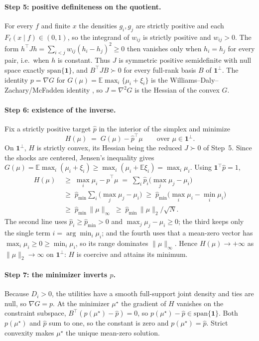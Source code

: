 \documentclass[12pt]{article}
\theoremstyle{remark}
\newcommand{\E}{\mathbb{E}}
\begin{document}
\paragraph{Step 5: positive definiteness on the quotient.} For every $f$
and finite $x$ the densities $g_i, g_j$ are strictly positive and each
$F_\ell(x\mid f)\in(0,1)$, so the integrand of $w_{ij}$ is strictly
positive and $w_{ij}>0$. The form
$h^\top J h = \sum_{i<j} w_{ij}(h_i-h_j)^2 \ge 0$ then vanishes only when
$h_i=h_j$ for every pair, i.e.\ when $h$ is constant. Thus $J$ is
symmetric positive semidefinite with null space exactly
$\mathrm{span}\{\mathbf{1}\}$, and $B^\top J B \succ 0$ for every
full-rank basis $B$ of $\mathbf{1}^\perp$. The identity $p=\nabla G$ for
$G(\mu)=\E\max_i\{\mu_i+\xi_i\}$ is the Williams--Daly--Zachary/McFadden
identity \citep{williams1977,daly1978,mcfadden1981}, so $J=\nabla^2 G$ is
the Hessian of the convex $G$.

\paragraph{Step 6: existence of the inverse.} Fix a strictly positive
target $\hat p$ in the interior of the simplex and minimize
\[
H(\mu) \;=\; G(\mu) - \hat p^\top \mu
\qquad \text{over } \mu\in\mathbf{1}^\perp .
\]
On $\mathbf{1}^\perp$, $H$ is strictly convex, its Hessian being the
reduced $J\succ0$ of Step~5. Since the shocks are centered, Jensen's
inequality gives
$G(\mu)=\E\max_i(\mu_i+\xi_i) \ge \max_i(\mu_i+\E\xi_i) = \max_i\mu_i$.
Using $\mathbf{1}^\top\hat p = 1$,
\begin{align*}
H(\mu)
&\;\ge\; \max_i \mu_i - \hat p^\top\mu
\;=\; \sum_i \hat p_i\big(\max_j \mu_j - \mu_i\big) \\
&\;\ge\; \hat p_{\min}\sum_i\big(\max_j\mu_j - \mu_i\big)
\;\ge\; \hat p_{\min}\big(\max_i\mu_i - \min_i\mu_i\big) \\
&\;\ge\; \hat p_{\min}\,\|\mu\|_\infty
\;\ge\; \hat p_{\min}\,\|\mu\|_2/\sqrt{N} .
\end{align*}
The second line uses $\hat p_i\ge \hat p_{\min}>0$ and
$\max_j\mu_j-\mu_i\ge 0$; the third keeps only the single term
$i=\arg\min_i\mu_i$; and the fourth uses that a mean-zero vector has
$\max_i\mu_i\ge 0\ge\min_i\mu_i$, so its range dominates
$\|\mu\|_\infty$. Hence $H(\mu)\to+\infty$ as $\|\mu\|_2\to\infty$ on
$\mathbf{1}^\perp$: $H$ is coercive and attains its minimum.

\paragraph{Step 7: the minimizer inverts $p$.} Because $D_i>0$, the
utilities have a smooth full-support joint density and ties are null, so
$\nabla G = p$. At the minimizer $\mu^\star$ the gradient of $H$ vanishes
on the constraint subspace, $B^\top(p(\mu^\star)-\hat p)=0$, so
$p(\mu^\star)-\hat p\in\mathrm{span}\{\mathbf{1}\}$. Both $p(\mu^\star)$
and $\hat p$ sum to one, so the constant is zero and $p(\mu^\star)=\hat
p$. Strict convexity makes $\mu^\star$ the unique mean-zero solution.
\end{document}

